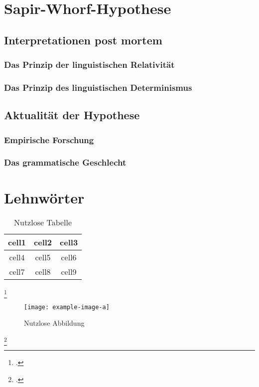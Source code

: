 \documentclass[12pt]{scrreprt}
\begin{document}
\chapter{Sapir-Whorf-Hypothese}
\label{chap:sphypothese}
	\section{Interpretationen post mortem}
	\label{sec:interpretpm}
		\subsection{Das Prinzip der linguistischen Relativität}
		\label{sec:lingrelativ}
		\subsection{Das Prinzip des linguistischen Determinismus}
		\label{sec:lingdetermin}
	\section{Aktualität der Hypothese}
	\label{sec:aktualität}
		\subsection{Empirische Forschung}
		\label{sec:empforschung}
		\subsection{Das grammatische Geschlecht}
		\label{sec:gramgeschlecht}

\chapter{Lehnwörter}
\label{chap:lehnwörter}

\begin{table}[!htb]
	\centering
	\caption[Nutzlose Tabelle {\autocite{a}}]{Nutzlose Tabelle\footnotemark}
	\begin{tabular}{ |c|c|c| }
		\hline
		cell1 & cell2 & cell3 \\
		\hline
		cell4 & cell5 & cell6 \\
		cell7 & cell8 & cell9 \\
		\hline
	\end{tabular}
	\label{tab:nutzlos}
\end{table}
\footcitetext{a}

\begin{figure}[!htb]
	\centering
	\texttt{[image: example-image-a]}
	\caption[Nutzlose Abbildung {\autocite{c}}]{Nutzlose Abbildung\footnotemark}
	\label{fig:nutzlos}
\end{figure}
\footcitetext{c}
\end{document}
